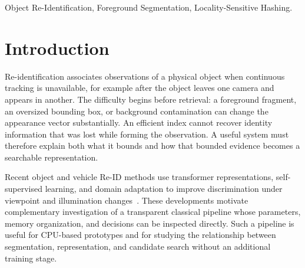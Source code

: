 \documentclass[conference]{IEEEtran}
\begin{document}
\begin{abstract}
Object re-identification on camera nodes depends on an explicit connection between the observed foreground region and the evidence used to retrieve it.
This paper presents a classical pipeline that forms coherent object observations, extracts a masked 602-dimensional appearance descriptor, and retrieves candidate exemplars using random-hyperplane locality-sensitive hashing (LSH) followed by exact cosine verification.
Core support, normalized size constraints, and temporal confirmation suppress isolated fragments before feature extraction.
The descriptor combines regional color, multiscale texture, gradient structure, and channel statistics, while mutable hash tables retain references to bounded identity exemplars.
Evaluation on a real parking-lot recording covers 9,484 frames over 316.13 seconds at $960\times540$ resolution. The run completes without frame-processing errors and achieves 72.55 frames/s of wall-clock replay throughput; human review establishes 69.23\% precision among accepted match decisions.
A separate synthetic-vector search benchmark measures a 4.77-fold query speedup over exhaustive cosine search at 10,000 vectors, retaining the exact nearest candidate for 98.33\% of queries.
\end{abstract}

\begin{IEEEkeywords}
Object Re-Identification, Foreground Segmentation, Locality-Sensitive Hashing.
\end{IEEEkeywords}

\section{Introduction}
Re-identification associates observations of a physical object when continuous tracking is unavailable, for example after the object leaves one camera and appears in another. The difficulty begins before retrieval: a foreground fragment, an oversized bounding box, or background contamination can change the appearance vector substantially. An efficient index cannot recover identity information that was lost while forming the observation. A useful system must therefore explain both what it bounds and how that bounded evidence becomes a searchable representation.

Recent object and vehicle Re-ID methods use transformer representations, self-supervised learning, and domain adaptation to improve discrimination under viewpoint and illumination changes~\cite{transreid2021,git2023,ssbver2023,daynight2024,vehiclemae2025}. These developments motivate complementary investigation of a transparent classical pipeline whose parameters, memory organization, and decisions can be inspected directly. Such a pipeline is useful for CPU-based prototypes and for studying the relationship between segmentation, representation, and candidate search without an additional training stage.
\end{document}

